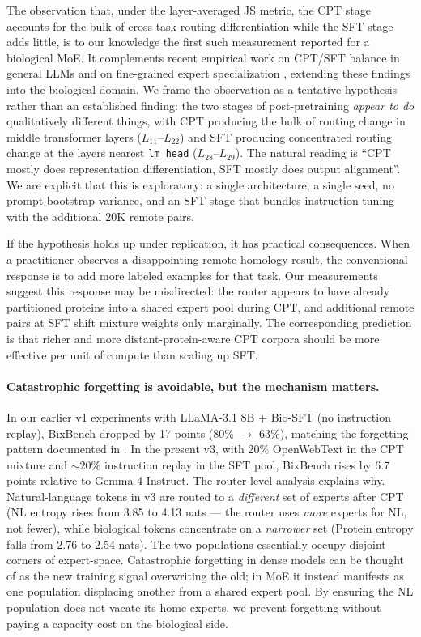 \documentclass[11pt]{article}
\begin{document}
The observation that, under the layer-averaged JS metric, the CPT stage accounts for the bulk of cross-task routing differentiation while the SFT stage adds little, is to our knowledge the first such measurement reported for a biological MoE. It complements recent empirical work on CPT/SFT balance in general LLMs \citep{ibrahim2024cpt, jindal2024balance} and on fine-grained expert specialization \citep{dai2024deepseekmoe, kanai2025moeinterp}, extending these findings into the biological domain. We frame the observation as a tentative hypothesis rather than an established finding: the two stages of post-pretraining \emph{appear to do} qualitatively different things, with CPT producing the bulk of routing change in middle transformer layers ($L_{11}$--$L_{22}$) and SFT producing concentrated routing change at the layers nearest \texttt{lm\_head} ($L_{28}$--$L_{29}$). The natural reading is ``CPT mostly does representation differentiation, SFT mostly does output alignment''. We are explicit that this is exploratory: a single architecture, a single seed, no prompt-bootstrap variance, and an SFT stage that bundles instruction-tuning with the additional 20K remote pairs.

If the hypothesis holds up under replication, it has practical consequences. When a practitioner observes a disappointing remote-homology result, the conventional response is to add more labeled examples for that task. Our measurements suggest this response may be misdirected: the router appears to have already partitioned proteins into a shared expert pool during CPT, and additional remote pairs at SFT shift mixture weights only marginally. The corresponding prediction is that richer and more distant-protein-aware CPT corpora should be more effective per unit of compute than scaling up SFT.

\paragraph{Catastrophic forgetting is avoidable, but the mechanism matters.}

In our earlier v1 experiments with LLaMA-3.1 8B + Bio-SFT (no instruction replay), BixBench dropped by 17 points (80\% $\to$ 63\%), matching the forgetting pattern documented in \citep{luo2023forgetting, huang2024sssr}. In the present v3, with 20\% OpenWebText \citep{gadre2021pile} in the CPT mixture and $\sim 20\%$ instruction replay in the SFT pool, BixBench rises by 6.7 points relative to Gemma-4-Instruct. The router-level analysis explains why. Natural-language tokens in v3 are routed to a \emph{different} set of experts after CPT (NL entropy rises from 3.85 to 4.13 nats --- the router uses \emph{more} experts for NL, not fewer), while biological tokens concentrate on a \emph{narrower} set (Protein entropy falls from 2.76 to 2.54 nats). The two populations essentially occupy disjoint corners of expert-space. Catastrophic forgetting in dense models can be thought of as the new training signal overwriting the old; in MoE it instead manifests as one population displacing another from a shared expert pool. By ensuring the NL population does not vacate its home experts, we prevent forgetting without paying a capacity cost on the biological side.
\end{document}
